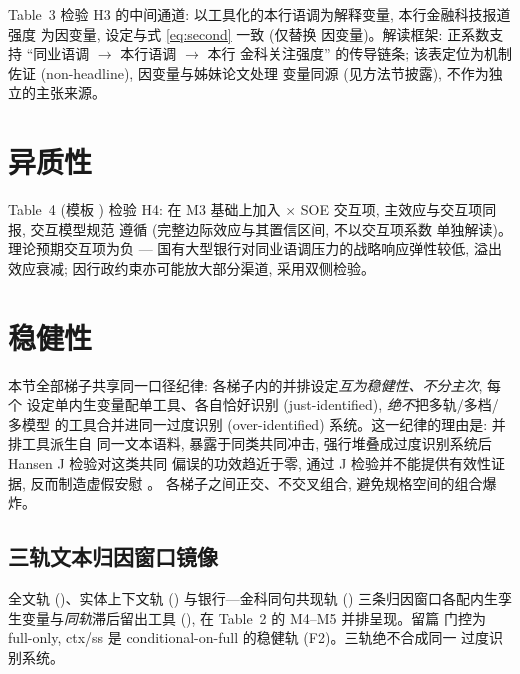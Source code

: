 Table~3 检验 H3 的中间通道: 以工具化的本行语调为解释变量, 本行金融科技报道强度
 为因变量, 设定与式 \eqref{eq:second} 一致 (仅替换
因变量)。解读框架: 正系数支持 ``同业语调 $\rightarrow$ 本行语调 $\rightarrow$ 本行
金科关注强度'' 的传导链条; 该表定位为机制佐证 (non-headline), 因变量与姊妹论文处理
变量同源 (见方法节披露), 不作为独立的主张来源。

\section{异质性}\label{sec:het}

Table~4 (模板 ) 检验 H4: 在 M3 基础上加入
 $\times$ SOE 交互项, 主效应与交互项同报, 交互模型规范
遵循 \textcite{brambor2006understanding} (完整边际效应与其置信区间, 不以交互项系数
单独解读)。理论预期交互项为负 --- 国有大型银行对同业语调压力的战略响应弹性较低,
溢出效应衰减; 因行政约束亦可能放大部分渠道, 采用双侧检验。

\section{稳健性}\label{sec:robust}

本节全部梯子共享同一口径纪律: 各梯子内的并排设定\emph{互为稳健性、不分主次}, 每个
设定单内生变量配单工具、各自恰好识别 (just-identified), \emph{绝不}把多轨/多档/多模型
的工具合并进同一过度识别 (over-identified) 系统。这一纪律的理由是: 并排工具派生自
同一文本语料, 暴露于同类共同冲击, 强行堆叠成过度识别系统后 Hansen J 检验对这类共同
偏误的功效趋近于零, 通过 J 检验并不能提供有效性证据, 反而制造虚假安慰
。
各梯子之间正交、不交叉组合, 避免规格空间的组合爆炸。

\subsection{三轨文本归因窗口镜像}
全文轨 ()、实体上下文轨 () 与银行—金科同句共现轨 ()
三条归因窗口各配内生孪生变量与\emph{同轨}滞后留出工具
(), 在 Table~2 的 M4--M5 并排呈现。留篇
门控为 full-only, ctx/ss 是 conditional-on-full 的稳健轨 (F2)。三轨绝不合成同一
过度识别系统。

